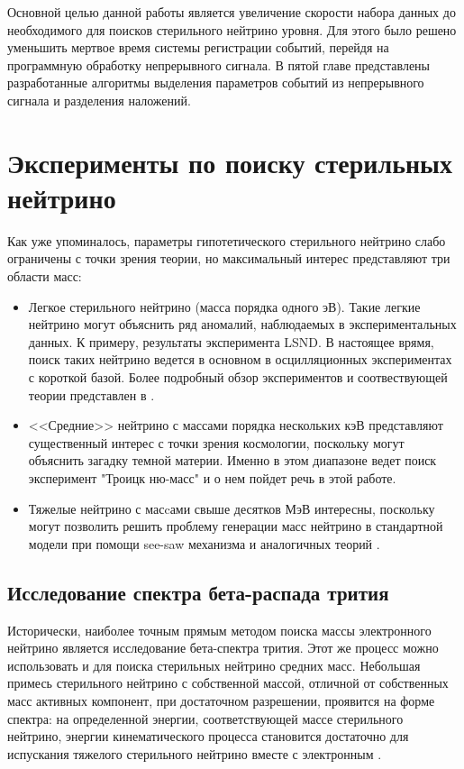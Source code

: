 \documentclass[a4paper,14pt]{extreport}
\begin{document}
Основной целью данной работы является увеличение скорости набора данных до необходимого для поисков стерильного нейтрино уровня. Для этого было решено уменьшить мертвое время системы регистрации событий, перейдя на программную обработку непрерывного сигнала. В пятой главе представлены разработанные алгоритмы выделения параметров событий из непрерывного сигнала и разделения наложений.

\chapter{Эксперименты по поиску стерильных нейтрино}

Как уже упоминалось, параметры гипотетического стерильного нейтрино слабо ограничены с точки зрения теории, но максимальный интерес представляют три области масс:
\begin{itemize}
    \item Легкое стерильного нейтрино (масса порядка одного эВ). Такие легкие нейтрино могут объяснить ряд аномалий, наблюдаемых в экспериментальных данных. К примеру, результаты эксперимента LSND\cite{ссылка!}. В настоящее врямя, поиск таких нейтрино ведется в основном в осцилляционных экспериментах с короткой базой. Более подробный обзор экспериментов и соотвествующей теории представлен в \cite{light-sterile-neutrino-whitepaper}.
    
    \item <<Средние>> нейтрино с массами порядка нескольких кэВ представляют существенный интерес с точки зрения космологии, поскольку могут объяснить загадку темной материи. Именно в этом диапазоне ведет поиск эксперимент "Троицк ню-масс" и о нем пойдет речь в этой работе. 
    
    \item Тяжелые нейтрино с масcами свыше десятков МэВ интересны, поскольку могут позволить решить проблему генерации масс нейтрино в стандартной модели при помощи see-saw механизма и аналогичных теорий .
\end{itemize}

\section{Исследование спектра бета-распада трития}

Исторически, наиболее точным прямым методом поиска массы электронного нейтрино является исследование бета-спектра трития. Этот же процесс можно использовать и для поиска стерильных нейтрино средних масс. Небольшая примесь стерильного нейтрино с собственной массой, отличной от собственных масс активных компонент, при достаточном разрешении, проявится на форме спектра: на определенной энергии, соответствующей массе стерильного нейтрино, энергии кинематического процесса становится достаточно для испускания тяжелого стерильного нейтрино вместе с электронным \cite{new-tests-for-and-bounds-on-neutrino-masses-and-lepton-mixing}\cite{role-of-sterile-neutrino-warm-dark-matter-in-rhenium-and-tritium-beta-decays}\cite{signatures-of-extra-dimensional-sterile-neutrinos}\cite{sterile-neutrinos-and-right-handed-currents-in-katrin}.
\end{document}
